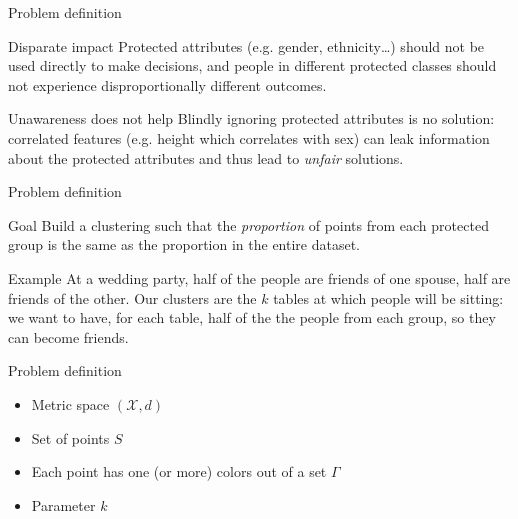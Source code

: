 \documentclass{beamer}
\begin{document}
\begin{frame}{Problem definition}
	\begin{block}{Disparate impact}
		Protected attributes (e.g. gender, ethnicity\dots) should
		not be used directly to make decisions, and people in different protected
		classes should not experience disproportionally different outcomes.
	\end{block}

	\pause

	\begin{block}{Unawareness does not help}
		Blindly ignoring protected attributes
		is no solution: correlated features (e.g. height which correlates with
		sex) can leak information about the protected attributes and thus lead to
		\emph{unfair} solutions.
	\end{block}
\end{frame}





\begin{frame}{Problem definition}
	\begin{block}{Goal}
		Build a clustering such that the \emph{proportion} of points from
		each protected group is the same as the proportion in the entire dataset.
	\end{block}

	\pause

	\begin{block}{Example}
		At a wedding party, half of the people are friends of one spouse,
		\alert{half} are friends of the other.
		Our clusters are the $k$ tables at which people will be sitting:
		we want to have,
		for each table,
		\alert{half} of the the people from each group,
		so they can become friends.
	\end{block}
	\pause
	\begin{center}
		\Large
	\end{center}
\end{frame}






\begin{frame}{Problem definition}
	\begin{itemize}
		\item Metric space $(\mathcal{X}, d)$
		\item Set of points $S$
		\item Each point has one (or more) colors out of a set $\Gamma$
		\item Parameter $k$
	\end{itemize}
\end{frame}
\end{document}

